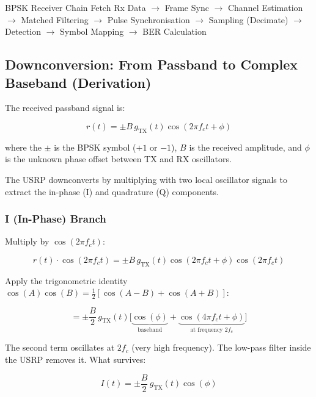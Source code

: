\begin{SummaryBox}{BPSK Receiver Chain}
Fetch Rx Data $\rightarrow$ Frame Sync $\rightarrow$ Channel Estimation $\rightarrow$ Matched Filtering $\rightarrow$ Pulse Synchronisation $\rightarrow$ Sampling (Decimate) $\rightarrow$ Detection $\rightarrow$ Symbol Mapping $\rightarrow$ BER Calculation
\end{SummaryBox}

\subsection{Downconversion: From Passband to Complex Baseband (Derivation)}

The received passband signal is:

\begin{equation}
r(t) = \pm B\,g_{\text{TX}}(t)\cos(2\pi f_c t + \phi)
\end{equation}

where the $\pm$ is the BPSK symbol ($+1$ or $-1$), $B$ is the received amplitude, and $\phi$ is the unknown phase offset between TX and RX oscillators.

The USRP downconverts by multiplying with two local oscillator signals to extract the in-phase (I) and quadrature (Q) components.

\subsubsection{I (In-Phase) Branch}

Multiply by $\cos(2\pi f_c t)$:

\begin{equation}
r(t)\cdot\cos(2\pi f_c t) = \pm B\,g_{\text{TX}}(t)\cos(2\pi f_c t + \phi)\cos(2\pi f_c t)
\end{equation}

Apply the trigonometric identity $\cos(A)\cos(B) = \tfrac{1}{2}[\cos(A - B) + \cos(A + B)]$:

\begin{equation}
= \pm \frac{B}{2}\,g_{\text{TX}}(t)\Big[\underbrace{\cos(\phi)}_{\text{baseband}} + \underbrace{\cos(4\pi f_c t + \phi)}_{\text{at frequency } 2f_c}\Big]
\end{equation}

The second term oscillates at $2f_c$ (very high frequency). The low-pass filter inside the USRP removes it. What survives:

\begin{equation}
I(t) = \pm \frac{B}{2}\,g_{\text{TX}}(t)\cos(\phi)
\end{equation}


